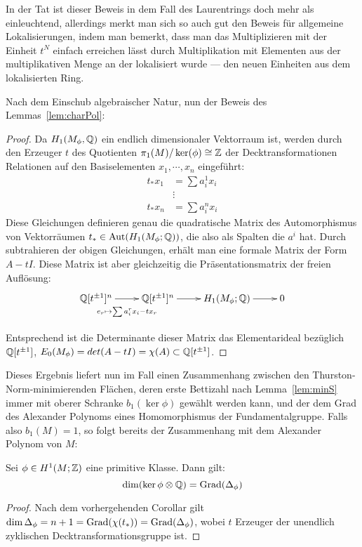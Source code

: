  In der Tat ist dieser Beweis in dem Fall des Laurentrings doch mehr als einleuchtend, allerdings merkt man sich so auch gut den Beweis für allgemeine Lokalisierungen, indem man bemerkt, dass man das Multiplizieren mit der Einheit $t^N$ einfach erreichen lässt durch Multiplikation mit Elementen aus der multiplikativen Menge an der lokalisiert wurde --- den neuen Einheiten aus dem lokalisierten Ring.

 Nach dem Einschub algebraischer Natur, nun der Beweis des Lemmas~\ref{lem:charPol}:
\begin{proof}
	Da $H_1(M_\phi,\mathbb{Q})$ ein endlich dimensionaler Vektorraum ist, werden durch den Erzeuger $t$ des Quotienten $\pi_1(M)/\ker(\phi) \cong \mathbb{Z}$ der Decktransformationen Relationen auf den Basiselementen $x_1,\cdots,x_n$ eingeführt:	
	\begin{align*}
		t_*x_1 &= \sum a_i^1 x_i \\
				&\vdots \\
		t_*x_n &= \sum a_i^n x_i
	\end{align*}
	Diese Gleichungen definieren genau die quadratische Matrix des Automorphismus von Vektorräumen $t_* \in \operatorname{Aut} (H_1(M_\phi;\mathbb{Q}))$, die also als Spalten die $a^i$ hat. Durch subtrahieren der obigen Gleichungen, erhält man eine formale Matrix der Form $A-tI$. Diese Matrix ist aber gleichzeitig die Präsentationsmatrix der freien Auflösung:
	\[
		\begin{xy}
			\xymatrix@L+5pt{\laurent \QQ t ^n \ar[r]_{e_r\mapsto \sum a_i^rx_i-tx_r} & \laurent \QQ t ^n \ar[r] & H_1(M_\phi;\QQ) \ar[r] &0\\}
		\end{xy}
	\]
	Entsprechend ist die Determinante dieser Matrix das Elementarideal bezüglich $\mathbb{Q}[t^{\pm 1}]$, $E_0(M_\phi)=det(A-tI)=\chi(A) \subset \mathbb{Q}[t^{\pm 1}] $. 
\end{proof}



Dieses Ergebnis liefert nun im Fall einen Zusammenhang zwischen den Thurston-Norm-minimierenden Flächen, deren erste Bettizahl nach Lemma~\ref{lem:minS} immer mit oberer Schranke $b_1(\ker\phi)$ gewählt werden kann, und der dem Grad des Alexander Polynoms eines Homomorphismus der Fundamentalgruppe. Falls also $b_1(M)=1$, so folgt bereits der Zusammenhang mit dem Alexander Polynom von $M$:
\begin{cor}
\label{cor:degreealex}
	Sei $\phi \in H^1(M;\mathbb{Z})$ eine primitive Klasse. Dann gilt:
	\[
		\dim(\ker\phi \otimes \mathbb{Q}) = \operatorname{Grad}(\Delta_\phi) 
	\]
\end{cor}
\begin{proof}
	Nach dem vorhergehenden Corollar gilt $\dim \Delta_\phi = n+1 = \operatorname{Grad}(\chi(t_*)) = \operatorname{Grad}(\Delta_\phi)$, wobei $t$ Erzeuger der unendlich zyklischen Decktransformationsgruppe ist. 
\end{proof}

